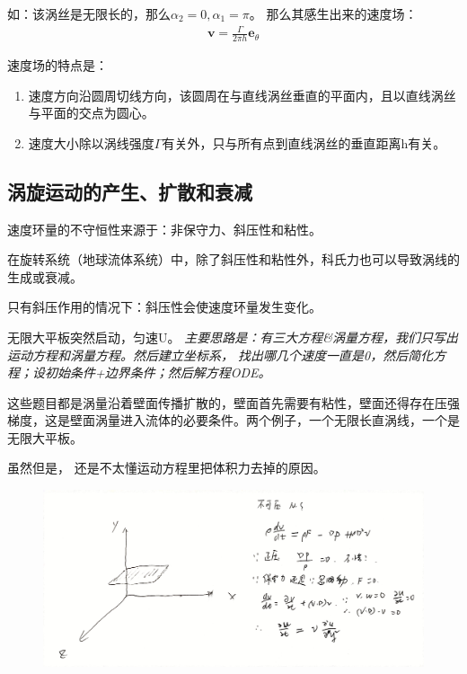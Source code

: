 \documentclass[UTF8,12pt]{article}
\begin{document}
如：该涡丝是无限长的，那么$\alpha _2 = 0, \alpha_1 = \pi$。
那么其感生出来的速度场：
\begin{align*}
    \boldsymbol v = \frac{\Gamma}{2\pi h} \boldsymbol e_\theta
\end{align*}

速度场的特点是：
\begin{enumerate}
    \item 速度方向沿圆周切线方向，该圆周在与直线涡丝垂直的平面内，且以直线涡丝与平面的交点为圆心。
    \item 速度大小除以涡线强度$\Gamma$有关外，只与所有点到直线涡丝的垂直距离h有关。
\end{enumerate}

\subsection{涡旋运动的产生、扩散和衰减}

速度环量的不守恒性来源于：非保守力、斜压性和粘性。

在旋转系统（地球流体系统）中，除了斜压性和粘性外，科氏力也可以导致涡线的生成或衰减。

只有斜压作用的情况下：斜压性会使速度环量发生变化。

无限大平板突然启动，匀速U。
\emph{主要思路是：有三大方程\&涡量方程，我们只写出运动方程和涡量方程。然后建立坐标系，
找出哪几个速度一直是0，然后简化方程；设初始条件+边界条件；然后解方程ODE。
}

这些题目都是涡量沿着壁面传播扩散的，壁面首先需要有粘性，壁面还得存在压强梯度，这是壁面涡量进入流体的必要条件。两个例子，一个无限长直涡线，一个是无限大平板。

虽然但是，{\color{red} 还是不太懂运动方程里把体积力去掉的原因。}

\begin{figure}[h]
    \centering
    \includegraphics[width=0.8\linewidth]{img/IMG_20201226_1102251.jpg}
\end{figure}
\end{document}
